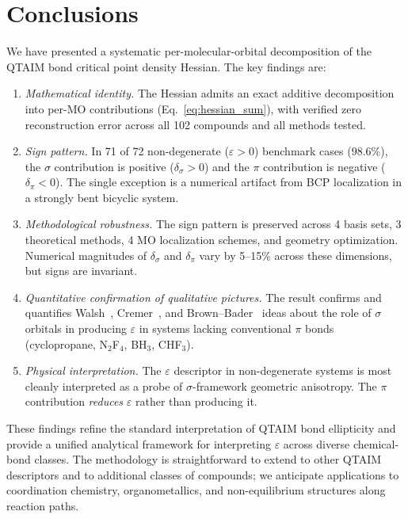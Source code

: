 \documentclass[11pt,a4paper]{article}
\newcommand{\delsg}{\delta_{\sigma}}
\newcommand{\delpi}{\delta_{\pi}}
\newcommand{\eps}{\varepsilon}
\begin{document}
\section{Conclusions}
\label{sec:conclusions}

We have presented a systematic per-molecular-orbital decomposition
of the QTAIM bond critical point density Hessian. The key findings are:

\begin{enumerate}
\item \emph{Mathematical identity.} The Hessian admits an exact
additive decomposition into per-MO contributions
(Eq.~\ref{eq:hessian_sum}), with verified zero reconstruction error
across all 102 compounds and all methods tested.
\item \emph{Sign pattern.} In 71 of 72 non-degenerate ($\eps > 0$)
benchmark cases (98.6\%), the $\sigma$ contribution is positive
($\delsg > 0$) and the $\pi$ contribution is negative ($\delpi < 0$).
The single exception is a numerical artifact from BCP localization
in a strongly bent bicyclic system.
\item \emph{Methodological robustness.} The sign pattern is preserved
across 4 basis sets, 3 theoretical methods, 4 MO localization
schemes, and geometry optimization. Numerical magnitudes of $\delsg$
and $\delpi$ vary by 5--15\% across these dimensions, but signs are
invariant.
\item \emph{Quantitative confirmation of qualitative pictures.} The
result confirms and quantifies Walsh~\citep{Walsh1947}, Cremer~\citep{Cremer1988},
and Brown--Bader~\citep{Brown2009} ideas about the role of $\sigma$
orbitals in producing $\eps$ in systems lacking conventional $\pi$
bonds (cyclopropane, N$_2$F$_4$, BH$_3$, CHF$_3$).
\item \emph{Physical interpretation.} The $\eps$ descriptor in
non-degenerate systems is most cleanly interpreted as a probe of
$\sigma$-framework geometric anisotropy. The $\pi$ contribution
\emph{reduces} $\eps$ rather than producing it.
\end{enumerate}

These findings refine the standard interpretation of QTAIM bond
ellipticity and provide a unified analytical framework for
interpreting $\eps$ across diverse chemical-bond classes. The
methodology is straightforward to extend to other QTAIM
descriptors and to additional classes of compounds; we anticipate
applications to coordination chemistry, organometallics, and
non-equilibrium structures along reaction paths.
\end{document}
